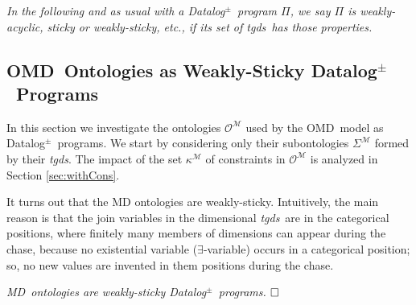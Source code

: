 \documentclass[format=acmsmall, review=false, screen=true]{acmart}
\newcommand{\boxtheorem}{\ensuremath{\hfill \Box}}
\newcommand{\mc}[1]{\mathcal{ #1}}
\newcommand{\dpm}{{Datalog}$^\pm$}
\newcommand{\omd}{OMD}
\newcommand{\md}{MD}
\newcommand{\tgds}{{\em tgds}}
\begin{document}
{\em In the following and as usual with a \dpm \ program $\Pi$, we say $\Pi$ is weakly-acyclic, sticky or weakly-sticky, etc.,  if its set of \tgds \ has those properties.}



\subsection{\omd \ Ontologies as Weakly-Sticky \dpm \ Programs}

In this section we investigate  the  ontologies $\mc{O}^\mc{M}$ used by the \omd \ model as \dpm \ programs. We start by considering only their subontologies $\Sigma^\mc{M}$ formed by their \tgds.
The impact of the set $\kappa^\mc{M}$ of constraints in $\mc{O}^\mc{M}$ is analyzed in Section \ref{sec:withCons}.

It turns out that the MD ontologies are weakly-sticky. Intuitively, the main reason is that the join variables in the dimensional \tgds \ are in the categorical positions, where finitely many members of dimensions can appear during the chase, because  no existential variable ($\exists$-variable) occurs in  a categorical position; so, no new values are invented in them positions during the chase.





\begin{proposition}\label{prop:weaklysticky}\em \md \ ontologies are weakly-sticky  \dpm \ programs.
\boxtheorem\end{proposition}
\end{document}
